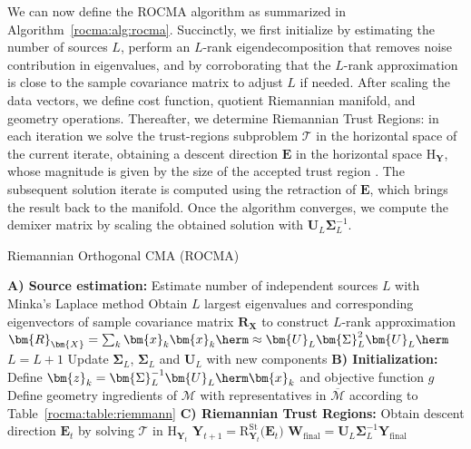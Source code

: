 We can now define the ROCMA algorithm as summarized in Algorithm~\ref{rocma:alg:rocma}. 
Succinctly, we first initialize by estimating the number of sources $L$, perform an $L$-rank eigendecomposition that removes noise contribution in eigenvalues, 
and by corroborating that the $L$-rank approximation is close to the sample covariance matrix to adjust $L$ if needed. 
After scaling the data vectors, we define cost function, quotient Riemannian manifold, and geometry operations. 
Thereafter, we determine Riemannian Trust Regions: in each iteration we solve the trust-regions subproblem $\mathcal{T}$ in the horizontal space of the current iterate, obtaining a descent direction $\bm{E}$ in the horizontal space $\mathrm{H}_{\bm{Y}}$, whose magnitude is given by the size of the accepted trust region \cite{Absil2008book}. 
The subsequent solution iterate is computed using the retraction of $\bm{E}$, which brings the result back to the manifold. 
Once the algorithm converges, we compute the demixer matrix by scaling the obtained solution with $\bm{U}_L\bm{\Sigma}_L^{-1}$.
\begin{algorithm}[htb]
	\caption{Riemannian Orthogonal CMA (ROCMA)}
	\label{rocma:alg:rocma}
	\begin{algorithmic}[1]
		\Statex \textbf{A) Source estimation:} 
		\State Estimate number of independent sources $L$ with Minka's Laplace method
		\State Obtain $L$ largest eigenvalues and corresponding eigenvectors of sample covariance matrix $\bm{R}_{\bm{X}}$ to construct $L$-rank approximation $\bm{R}_{\bm{X}}=\sum_k\bm{x}_k\bm{x}_k\herm\approx\bm{U}_L\bm{\Sigma}_L^2\bm{U}_L\herm$
		\State $L=L+1$
		\State Update $\bm{\Sigma}_L$, $\bm{\Sigma}_L$ and $\bm{U}_L$ with new components
		\EndWhile
		\Statex \textbf{B) Initialization:} 
		\State Define $\bm{z}_k=\bm{\Sigma}_L^{-1}\bm{U}_L\herm\bm{x}_k$ and objective function $g$
		\State Define geometry ingredients of $\mathcal{M}$ with representatives in $\overline{\mathcal{M}}$ according to Table~\ref{rocma:table:riemmann} 
		\Statex \textbf{C) Riemannian Trust Regions:}
		\State Obtain descent direction $\bm{E}_t$ by solving $\mathcal{T}$ in $\mathrm{H}_{\bm{Y}_t}$
		\State $\displaystyle \bm{Y}_{t+1}=\mathrm{R}_{\bm{Y}_t}^{\mathrm{St}}\big(\bm{E}_t\big)$
		\EndWhile
		\State $\bm{W}_{\mathrm{final}}=\bm{U}_L\bm{\Sigma}_L^{-1}\bm{Y}_{\mathrm{final}}$
	\end{algorithmic}
\end{algorithm}

